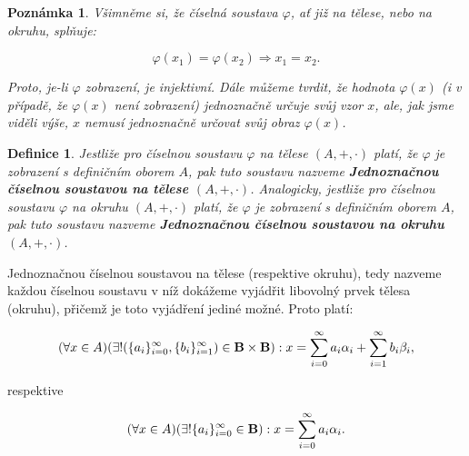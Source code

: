 \documentclass[12pt]{book}
\newtheorem{definice}{Definice}
\newtheorem{pozn}{Poznámka}
\begin{document}
\begin{pozn}
Všimněme si, že číselná soustava $\varphi$, ať již na tělese, nebo na okruhu, splňuje:

$$\varphi (x_1) = \varphi(x_2) \Rightarrow x_1 = x_2.$$

Proto, je-li $\varphi$ zobrazení, je injektivní.
Dále můžeme tvrdit, že hodnota $\varphi(x)$ (i v případě, že $\varphi(x)$ není zobrazení) jednoznačně určuje svůj vzor $x$, ale, jak jsme viděli výše, $x$ nemusí jednoznačně určovat svůj obraz $\varphi(x)$.

\end{pozn}


	\begin{definice}
		Jestliže pro číselnou soustavu $\varphi$ na tělese $(A,+,\cdot)$ platí, že $\varphi$ je zobrazení s definičním oborem $A$, pak tuto soustavu nazveme \textbf{Jednoznačnou číselnou soustavou na tělese $(A,+,\cdot)$}. Analogicky, jestliže pro číselnou soustavu $\varphi$ na okruhu $(A,+,\cdot)$ platí, že $\varphi$ je zobrazení s definičním oborem $A$, pak tuto soustavu nazveme \textbf{Jednoznačnou číselnou soustavou na okruhu $(A,+,\cdot)$}.
	\end{definice}

Jednoznačnou číselnou soustavou na tělese (respektive okruhu), tedy nazveme každou číselnou soustavu v níž dokážeme vyjádřit libovolný prvek tělesa (okruhu), přičemž je toto vyjádření jediné možné. Proto platí:	

$$(\forall x \in A) (\exists!(\{a_i\}_{i=0}^{\infty},\{b_i\}_{i=1}^{\infty})\in\textbf{B}\times\textbf{B}): x = \sum_{i=0}^{\infty} a_{i}\alpha_{i} + \sum_{i=1}^{\infty} b_{i}\beta_{i},$$

respektive

$$(\forall x \in A) (\exists! \{a_i\}_{i=0}^{\infty} \in \textbf{B}): x = \sum_{i=0}^{\infty} a_{i}\alpha_{i}.$$
\end{document}
